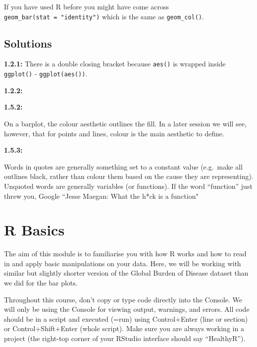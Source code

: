 \documentclass[]{book}
\makeatletter
\newenvironment{Shaded}{\begin{snugshade}}{\end{snugshade}}
\newcommand{\KeywordTok}[1]{\textcolor[rgb]{0.13,0.29,0.53}{\textbf{#1}}}
\newcommand{\DataTypeTok}[1]{\textcolor[rgb]{0.13,0.29,0.53}{#1}}
\newcommand{\StringTok}[1]{\textcolor[rgb]{0.31,0.60,0.02}{#1}}
\newcommand{\OperatorTok}[1]{\textcolor[rgb]{0.81,0.36,0.00}{\textbf{#1}}}
\newcommand{\NormalTok}[1]{#1}
\newenvironment{kframe}{%
\medskip{}
\setlength{\fboxsep}{.8em}
 \def\at@end@of@kframe{}%
 \ifinner\ifhmode%
  \def\at@end@of@kframe{\end{minipage}}%
  \begin{minipage}{\columnwidth}%
 \fi\fi%
 \def\FrameCommand##1{\hskip\@totalleftmargin \hskip-\fboxsep
 \colorbox{shadecolor}{##1}\hskip-\fboxsep
     \hskip-\linewidth \hskip-\@totalleftmargin \hskip\columnwidth}%
 \MakeFramed {\advance\hsize-\width
   \@totalleftmargin\z@ \linewidth\hsize
   \@setminipage}}%
 {\par\unskip\endMakeFramed%
 \at@end@of@kframe}
\renewenvironment{Shaded}{\begin{kframe}}{\end{kframe}}
\theoremstyle{definition}
\theoremstyle{definition}
\theoremstyle{definition}
\theoremstyle{remark}
\makeatother
\begin{document}
If you have used R before you might have come across
\texttt{geom\_bar(stat\ =\ "identity")} which is the same as
\texttt{geom\_col()}.

\section{Solutions}\label{solutions}

\textbf{1.2.1:} There is a double closing bracket because \texttt{aes()}
is wrapped inside \texttt{ggplot()} - \texttt{ggplot(aes())}.

\textbf{1.2.2:}

\begin{Shaded}
\end{Shaded}

\textbf{1.5.2:}

On a barplot, the colour aesthetic outlines the fill. In a later session
we will see, however, that for points and lines, colour is the main
aesthetic to define.

\textbf{1.5.3:}

Words in quotes are generally something set to a constant value
(e.g.~make all outlines black, rather than colour them based on the
cause they are representing). Unquoted words are generally variables (or
functions). If the word ``function'' just threw you, Google ``Jesse
Maegan: What the h*ck is a function"

\chapter{R Basics}\label{r-basics}

The aim of this module is to familiarise you with how R works and how to
read in and apply basic manipulations on your data. Here, we will be
working with similar but slightly shorter version of the Global Burden
of Disease dataset than we did for the bar plots.

Throughout this course, don't copy or type code directly into the
Console. We will only be using the Console for viewing output, warnings,
and errors. All code should be in a script and executed (=run) using
Control+Enter (line or section) or Control+Shift+Enter (whole script).
Make sure you are always working in a project (the right-top corner of
your RStudio interface should say ``HealthyR'').
\end{document}
